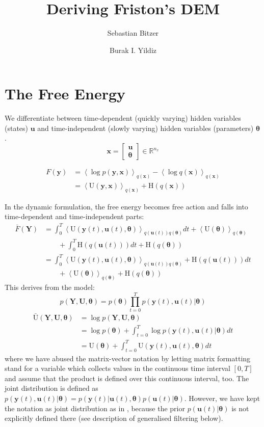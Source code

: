 \documentclass[a4paper,10pt]{article}
\title{Deriving Friston's DEM}
\author{Sebastian Bitzer \and Burak I. Yildiz}
\newcommand{\bs}[1]{\mathbf{#1}}					%
\newcommand{\bgs}[1]{\boldsymbol{#1}}				%
\newcommand{\eq}[1]{\begin{equation} #1 \end{equation}}%
\renewcommand{\ss}{u}         %
\newcommand{\so}{y}         %
\newcommand{\sh}{x}         %
\renewcommand{\sp}{\theta}    %
\newcommand{\ps}{\bs{\ss}}    %
\newcommand{\po}{\bs{\so}}    %
\newcommand{\ph}{\bs{\sh}}    %
\newcommand{\pp}{\bgs{\sp}} %
\newcommand{\Ps}{\bs{U}}    %
\newcommand{\Po}{\bs{Y}}    %
\newcommand{\E}[2][]{\left\langle #2 \right\rangle_{#1}}	%
\newcommand{\Ent}{\mathrm{H}}			%
\newcommand{\U}{\mathrm{U}}			%
\newcommand{\Ua}{\bar{\mathrm{U}}}		%
\newcommand{\R}{\mathbb{R}}				%
\begin{document}
\maketitle
\tableofcontents

\begin{abstract}

\end{abstract}

\section{The Free Energy}
We differentiate between time-dependent (quickly varying) hidden variables (states) $\ps$ and time-independent (slowly varying) hidden variables (parameters) $\pp$.
\eq{
    \ph = \left[\begin{array}{c}
            \ps\\
            \pp
          \end{array}\right] \in \R^{n_\sh}
}

\eq{\begin{split}
    F(\po) &= \E[q(\ph)]{\log p(\po,\ph)} - \E[q(\ph)]{\log q(\ph)}\\
               &= \E[q(\ph)]{\U(\po,\ph)} + \Ent(q(\ph))
\end{split}}

In the dynamic formulation, the free energy becomes free action and falls into time-dependent and time-independent parts:
\eq{\begin{split}\label{eq:freeAction}
    \bar{F}(\Po) &= \int_0^T \E[q(\ps(t))q(\pp)]{\U(\po(t),\ps(t),\pp)}dt + \E[q(\pp)]{\U(\pp)}\\ 
    & \qquad + \int_0^T\Ent(q(\ps(t)))dt + \Ent(q(\pp))\\
    &= \int_0^T \E[q(\ps(t))q(\pp)]{\U(\po(t),\ps(t),\pp)} + \Ent(q(\ps(t))) dt\\
    & \qquad  + \E[q(\pp)]{\U(\pp)} + \Ent(q(\pp))
\end{split}}
This derives from the model:
\eq{
    p(\Po,\Ps,\pp) = p(\pp)\prod_{t=0}^T p(\po(t),\ps(t)|\pp)
}
\eq{\begin{split}\label{eq:intAction}
    \Ua(\Po,\Ps,\pp) &= \log p(\Po,\Ps,\pp)\\
    &= \log p(\pp) + \int_{t=0}^T \log p(\po(t),\ps(t)|\pp)dt\\
    &= \U(\pp) + \int_{t=0}^T \U(\po(t),\ps(t),\pp)dt
\end{split}}
where we have abused the matrix-vector notation by letting matrix formatting stand for a variable which collects values in the continuous time interval $[0,T]$ and assume that the product is defined over this continuous interval, too. The joint distribution is defined as $p(\po(t),\ps(t)|\pp) = p(\po(t)|\ps(t),\pp)p(\ps(t)|\pp)$. However, we have kept the notation as joint distribution as in \citep{Friston2008a}, because the prior $p(\ps(t)|\pp)$ is not explicitly defined there (see description of generalised filtering below). 
\end{document}
